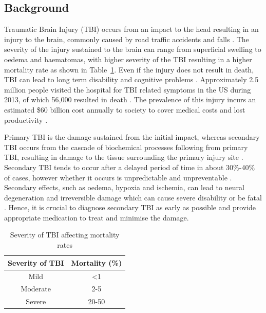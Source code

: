 \subsection{Background}
Traumatic Brain Injury (TBI) occurs from an impact to the head resulting in an injury to the brain, commonly caused by road traffic accidents and falls \cite{Langlois2006}. The severity of the injury sustained to the brain can range from superficial swelling to oedema and haematomas, with higher severity of the TBI resulting in a higher mortality rate as shown in Table~\ref{table:severity of TBI}. Even if the injury does not result in death, TBI can lead to long term disability and cognitive problems \cite{WorldHealthOrganisation2006}. Approximately 2.5 million people visited the hospital for TBI related symptoms in the US during 2013, of which 56,000 resulted in death \cite{Taylor2017}. The prevalence of this injury incurs an estimated \$60 billion cost annually to society to cover medical costs and lost productivity \cite{Finkelstein2009}. 

Primary TBI is the damage sustained from the initial impact, whereas secondary TBI occurs from the cascade of biochemical processes following from primary TBI, resulting in damage to the tissue surrounding the primary injury site \cite{Norton2008}. Secondary TBI tends to occur after a delayed period of time in about 30\%-40\% of cases, however whether it occurs is unpredictable and unpreventable \cite{Pagkalos2017}. Secondary effects, such as oedema, hypoxia and ischemia, can lead to neural degeneration and irreversible damage which can cause severe disability or be fatal \cite{Murthy2005}. Hence, it is crucial to diagnose secondary TBI as early as possible and provide appropriate medication to treat and minimise the damage.

\begin{table}[H]
\centering
\begin{tabular}{||c c||} 
 \hline
 Severity of TBI & Mortality (\%) \\ [0.5ex] 
 \hline\hline
 Mild & \textless 1 \\ 
 Moderate & 2-5 \\
 Severe & 20-50 \\
 \hline
\end{tabular}
\caption{Severity of TBI affecting mortality rates \cite{WorldHealthOrganisation2006}}
\label{table:severity of TBI}
\end{table}


